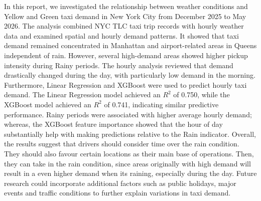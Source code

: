 \documentclass[11pt]{article}
\begin{document}
In this report, we investigated the relationship between weather conditions and Yellow and Green taxi demand in New York City from December 2025 to May 2026. The analysis combined NYC TLC taxi trip records with hourly weather data and examined spatial and hourly demand patterns. It showed that taxi demand remained concentrated in Manhattan and airport-related areas in Queens independent of rain. However, several high-demand areas showed higher pickup intensity during Rainy periods. The hourly analysis reviewed that demand drastically changed during the day, with particularly low demand in the morning. Furthermore, Linear Regression and XGBoost were used to predict hourly taxi demand. The Linear Regression model achieved an $R^2$ of 0.750, while the XGBoost model achieved an $R^2$ of 0.741, indicating similar predictive performance. Rainy periods were associated with higher average hourly demand; whereas, the XGBoost feature importance showed that the hour of day substantially help with making predictions relative to the Rain indicator. Overall, the results suggest that drivers should consider time over the rain condition. They should also favour certain locations as their main base of operations. Then, they can take in the rain condition, since areas originally with high demand will result in a even higher demand when its raining, especially during the day.  Future research could incorporate additional factors such as public holidays, major events and traffic conditions to further explain variations in taxi demand.





\printbibliography
\end{document}
